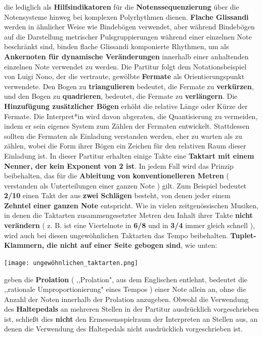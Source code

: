 \documentclass[12pt]{article}
\newcommand*\circled[1]{\tikz[baseline=(char.base)]{
            \node[shape=circle,draw,inner sep=1pt] (char) {#1};}}
\begin{document}
die lediglich als \textbf{Hilfsindikatoren} für die \textbf{Notenssequenzierung} über die Notensysteme hinweg bei komplexen Polyrhythmen dienen. \textbf{\circled{4} Flache Glissandi } werden in ähnlicher Weise wie Bindebögen verwendet, aber während Bindebögen auf die Darstellung metrischer Pulsgruppierungen während einer einzelnen Note beschränkt sind, binden flache Glissandi komponierte Rhythmen, um als \textbf{Ankernoten für dynamische Veränderungen} innerhalb einer anhaltenden einzelnen Note verwendet zu werden. \textbf{\circled{5}} Die Partitur folgt dem Notationsbeispiel von Luigi Nono, der die vertraute, gewölbte \textbf{Fermate} als Orientierungspunkt verwendete. Den Bogen zu \textbf{triangulieren} bedeutet, die Fermate zu \textbf{verkürzen}, und den Bogen zu \textbf{quadrieren}, bedeutet, die Fermate zu \textbf{verlängern}. Die \textbf{Hinzufügung zusätzlicher Bögen} erhöht die relative Länge oder Kürze der Fermate. Die Interpret*in wird davon abgeraten, die Quantisierung zu vermeiden, indem er sein eigenes System zum Zählen der Fermaten entwickelt. Stattdessen sollten die Fermaten als Einladung verstanden werden, eher zu warten als zu zählen, wobei die Form ihrer Bögen ein Zeichen für den relativen Raum dieser Einladung ist. \textbf{\circled{6}} In dieser Partitur erhalten einige Takte eine \textbf{Taktart mit einem Nenner, der kein Exponent von 2 ist}. In jedem Fall wird das Prinzip beibehalten, das für die \textbf{Ableitung von konventionelleren Metren} ( verstanden als Unterteilungen einer ganzen Note ) gilt. Zum Beispiel bedeutet \textbf{2/10} einen Takt der aus \textbf{zwei Schlägen} besteht, von denen jeder einem \textbf{Zehntel einer ganzen Note} entspricht. Wie in vielen zeitgenössischen Musiken, in denen die Taktarten zusammengesetzter Metren den Inhalt ihrer Takte \textbf{nicht verändern} ( z. B. ist eine Viertelnote in \textbf{6/8} und in \textbf{3/4} immer gleich schnell ), wird auch bei diesen ungewöhnlichen Taktarten das Tempo beibehalten. \textbf{\circled{7} Tuplet-Klammern, die nicht auf einer Seite gebogen sind}, wie unten:

\begin{center}
\texttt{[image: ungewöhnlichen\_taktarten.png]}
\end{center}

geben die \textbf{Prolation} ( ,,Prolation", aus dem Englischen entlehnt, bedeutet die ,,rationale Umproportionierung" eines Tempos ) einer Note allein an, ohne die Anzahl der Noten innerhalb der Prolation anzugeben. \textbf{\circled{8}} Obwohl die Verwendung des \textbf{Haltepedals} an mehreren Stellen in der Partitur ausdrücklich vorgeschrieben ist, schließt dies \textbf{nicht} den Ermessensspielraum der Interpreten an Stellen aus, an denen die Verwendung des Haltepedals nicht ausdrücklich vorgeschrieben ist.
\endgroup
\end{document}
